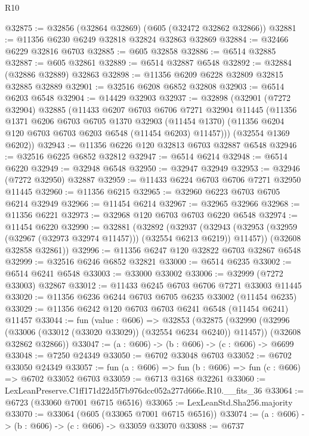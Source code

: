 \begin{lexlean}{R10}
\begin{coremodule}
@32875 := @32856 (@32864 @32869) (@605 (@32472 @32862 @32866))
@32881 := @11356 @6230 @6249 @32818 @32824 @32863 @32869
@32884 := @32466 @6229 @32816 @6703
@32885 := @605 @32858
@32886 := @6514 @32885
@32887 := @605 @32861
@32889 := @6514 @32887 @6548
@32892 := @32884 (@32886 @32889) @32863
@32898 := @11356 @6209 @6228 @32809 @32815 @32885 @32889
@32901 := @32516 @6208 @6852 @32808
@32903 := @6514 @6203 @6548
@32904 := @14429 @32903
@32937 := @32898
    (@32901
      (@7272 @32904)
      @32885
      (@11433
        @6207
        @6703
        @6706
        @7271
        @32904
        @11445
        (@11356
          @1371
          @6206
          @6703
          @6705
          @1370
          @32903
          (@11454 @1370)
          (@11356 @6204 @120 @6703 @6703 @6203 @6548 (@11454 @6203) @11457)))
      (@32554 @1369 @6202))
@32943 := @11356 @6226 @120 @32813 @6703 @32887 @6548
@32946 := @32516 @6225 @6852 @32812
@32947 := @6514 @6214
@32948 := @6514 @6220
@32949 := @32948 @6548
@32950 := @32947 @32949
@32953 := @32946 (@7272 @32950) @32887
@32959 := @11433 @6224 @6703 @6706 @7271 @32950 @11445
@32960 := @11356 @6215
@32965 := @32960 @6223 @6703 @6705 @6214 @32949
@32966 := @11454 @6214
@32967 := @32965 @32966
@32968 := @11356 @6221
@32973 := @32968 @120 @6703 @6703 @6220 @6548
@32974 := @11454 @6220
@32990 := @32881
    (@32892
      (@32937
        (@32943 (@32953 (@32959 (@32967 (@32973 @32974 @11457))) (@32554 @6213 @6219)) @11457))
      (@32608 @32858 @32861))
@32996 := @11356 @6247 @120 @32822 @6703 @32867 @6548
@32999 := @32516 @6246 @6852 @32821
@33000 := @6514 @6235
@33002 := @6514 @6241 @6548
@33003 := @33000 @33002
@33006 := @32999 (@7272 @33003) @32867
@33012 := @11433 @6245 @6703 @6706 @7271 @33003 @11445
@33020 := @11356 @6236 @6244 @6703 @6705 @6235 @33002 (@11454 @6235)
@33029 := @11356 @6242 @120 @6703 @6703 @6241 @6548 (@11454 @6241) @11457
@33044 := fun (value : @606) =>
  @32853
    (@32875
      (@32990 (@32996 (@33006 (@33012 (@33020 @33029)) (@32554 @6234 @6240)) @11457))
      (@32608 @32862 @32866))
@33047 := (a : @606) -> (b : @606) -> (c : @606) -> @6699
@33048 := @7250 @24349
@33050 := @6702 @33048 @6703
@33052 := @6702 @33050 @24349
@33057 := fun (a : @606) => fun (b : @606) => fun (c : @606) => @6702 @33052 @6703
@33059 := @6713 @3168 @32261
@33060 := LexLeanPreserve.C1ff171d22d5f7b976dcc052a277d666e.R10.__fits_36
@33064 := @6723 (@33060 @7001 @6715 @6516)
@33065 := LexLeanStd.Sha256.majority
@33070 := @33064 (@605 (@33065 @7001 @6715 @6516))
@33074 := (a : @606) -> (b : @606) -> (c : @606) -> @33059 @33070
@33088 := @6737

\end{coremodule}
\end{lexlean}
